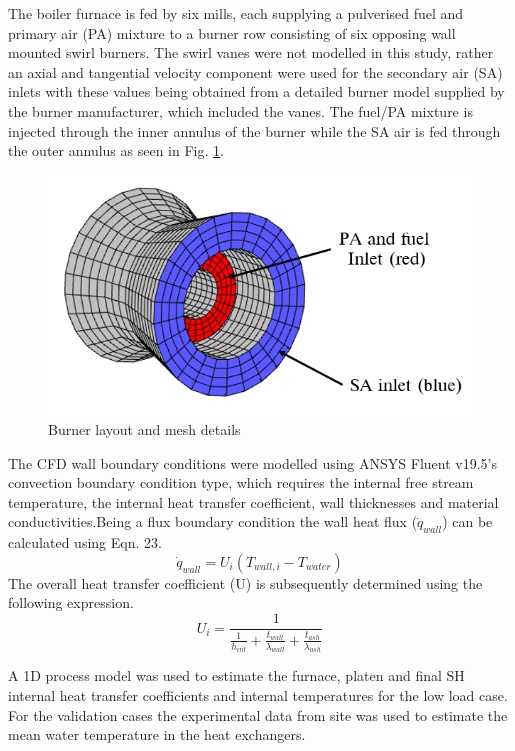 \documentclass[11pt,cleanfoot]{asme2ej}
\begin{document}
The boiler furnace is fed by six mills, each supplying a pulverised fuel and primary air (PA) mixture to a burner row consisting of six opposing wall mounted swirl burners. The swirl vanes were not modelled in this study, rather an axial and tangential velocity component were used for the secondary air (SA) inlets with these values being obtained from a detailed burner model supplied by the burner manufacturer, which included the vanes. The fuel/PA mixture is injected through the inner annulus of the burner while the SA air is fed through the outer annulus as seen in Fig. \ref{fig_burner_mesh}.
\newpage
\begin{figure}
\centerline{\includegraphics[scale=0.45]{BURNER_MESH}}
\caption{Burner layout and mesh details}
\label{fig_burner_mesh}
\end{figure}

The CFD wall boundary conditions were modelled using ANSYS Fluent v19.5’s convection boundary condition type, which requires the internal free stream temperature, the internal heat transfer coefficient, wall thicknesses and material conductivities.Being a flux boundary condition the wall heat flux ($\dot{q}_{wall}$) can be calculated using Eqn. 23.
\begin{equation}\label{eqn_q_flux}
\dot{q}_{wall} = U_i(T_{wall,i}-T_{water})
\end{equation}
The overall heat transfer coefficient (U) is subsequently determined using the following expression.
\begin{equation}\label{eqn_overall_heat_coeff}
U_i=\frac{1}{\frac{1}{h_{int}}+\frac{t_{wall}}{\lambda_{wall}}+\frac{t_{ash}}{\lambda_{ash}}}
\end{equation}

A 1D process model was used to estimate the furnace, platen and final SH internal heat transfer coefficients and internal temperatures for the low load case. For the validation cases the experimental data from site was used to estimate the mean water temperature in the heat exchangers.
\end{document}
